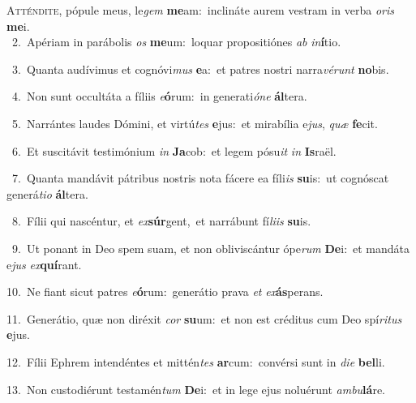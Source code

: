 \lettrine{\initial\textcolor{\initialcolor}{A}}{tténdite,} pópule meus, le\textit{gem} \textbf{me}\-am:~\star inclináte aurem vestram in verba \textit{o}\-\textit{ris} \textbf{me}\-i.\\
{\numbfont\textcolor{\numbcolor}{~2.}}~Apériam in parábolis \textit{os} \textbf{me}\-um:~\star loquar propositiónes \textit{ab} \textit{in}\-\textbf{í}tio.\par
{\numbfont\textcolor{\numbcolor}{~3.}}~Quanta audívimus et cognóvi\textit{mus} \textbf{e}\-a:~\star et patres nostri narra\-\textit{vé}\-\textit{runt} \textbf{no}\-bis.\par
{\numbfont\textcolor{\numbcolor}{~4.}}~Non sunt occultáta a fíliis \textit{e}\-\textbf{ó}rum:~\star in generati\-\textit{ó}\-\textit{ne} \textbf{ál}\-tera.\par
{\numbfont\textcolor{\numbcolor}{~5.}}~Narrántes laudes Dómini, et virtú\textit{tes} \textbf{e}\-jus:~\star et mirabília e\-\textit{jus}\-, \textit{quæ} \textbf{fe}\-cit.\par
{\numbfont\textcolor{\numbcolor}{~6.}}~Et suscitávit testimónium \textit{in} \textbf{Ja}\-cob:~\star et legem pósu\textit{it} \textit{in} \textbf{Is}\-raël.\par
{\numbfont\textcolor{\numbcolor}{~7.}}~Quanta mandávit pátribus nostris nota fácere ea fíli\textit{is} \textbf{su}\-is:~\star ut cognóscat generá\-\textit{ti}\-\textit{o} \textbf{ál}\-tera.\par
{\numbfont\textcolor{\numbcolor}{~8.}}~Fílii qui nascéntur, et \textit{ex}\-\textbf{súr}gent,~\star et narrábunt fí\-\textit{li}\-\textit{is} \textbf{su}\-is.\par
{\numbfont\textcolor{\numbcolor}{~9.}}~Ut ponant in Deo spem suam, et non obliviscántur ópe\textit{rum} \textbf{De}\-i:~\star et mandáta e\textit{jus} \textit{ex}\-\textbf{quí}rant.\par
{\numbfont\textcolor{\numbcolor}{10.}}~Ne fiant sicut patres \textit{e}\-\textbf{ó}rum:~\star generátio prava \textit{et} \textit{ex}\-\textbf{ás}perans.\par
{\numbfont\textcolor{\numbcolor}{11.}}~Generátio, quæ non diréxit \textit{cor} \textbf{su}\-um:~\star et non est créditus cum Deo spí\-\textit{ri}\-\textit{tus} \textbf{e}\-jus.\par
{\numbfont\textcolor{\numbcolor}{12.}}~Fílii Ephrem intendéntes et mittén\textit{tes} \textbf{ar}\-cum:~\star convérsi sunt in \textit{di}\-\textit{e} \textbf{bel}\-li.\par
{\numbfont\textcolor{\numbcolor}{13.}}~Non custodiérunt testamén\textit{tum} \textbf{De}\-i:~\star et in lege ejus noluérunt \textit{am}\-\textit{bu}\textbf{lá}re.\par

